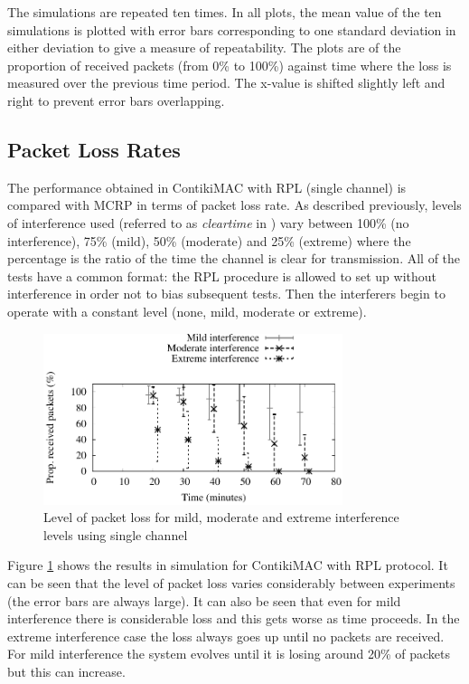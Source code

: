 
The simulations are repeated ten times. In all plots, the mean value of the ten simulations is plotted with error bars corresponding to one standard deviation in either deviation to give a measure of repeatability. The plots are of the proportion of received packets (from 0\% to 100\%) against time where the loss is measured over the previous time period.  The x-value is shifted slightly left and right to prevent error bars overlapping.

\subsection{Packet Loss Rates}
The performance obtained in ContikiMAC with RPL (single channel) is compared with MCRP in terms of packet loss rate.
As described previously, levels of interference used (referred to as \emph{clear\textunderscore time} in \cite{interferenceModel}) vary between 100\% (no interference), 75\% (mild), 50\% (moderate) and 25\% (extreme) where the percentage is the ratio of the time the channel is clear for transmission.  All of the tests have a common format: the RPL procedure is allowed to set up without interference in order not to bias subsequent tests.
Then the interferers begin to operate with a constant level (none, mild, moderate or extreme).

\begin{figure}
\centering
\includegraphics[width=0.78\textwidth]{single_channel.pdf}
\caption{Level of packet loss for mild, moderate and extreme interference levels using single channel}
\label{fig:interference}
\end{figure}

Figure \ref{fig:interference} shows the results in simulation for ContikiMAC with RPL protocol. It can be seen that the level of packet loss varies considerably between experiments (the error bars are always large). It can also be seen that even for mild interference there is considerable loss and this gets worse as time proceeds. In the extreme interference case the loss always goes up until no packets are received. For mild interference the system evolves until it is losing around 20\% of packets but this can increase.


